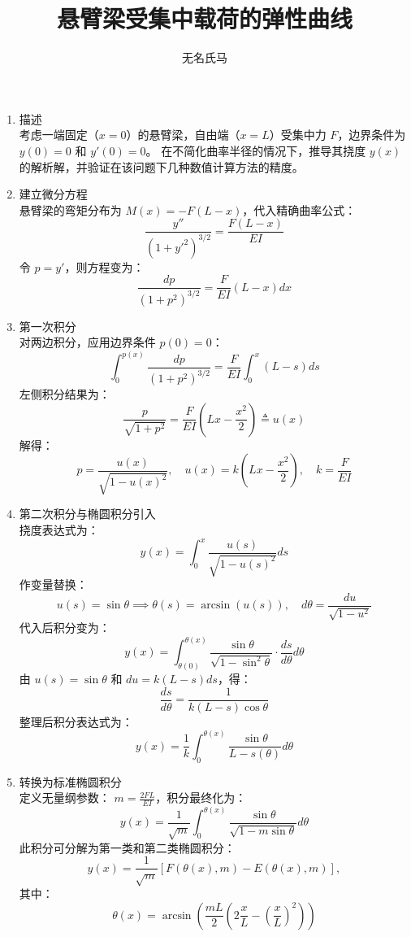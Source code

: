 \documentclass[12pt, a4paper,oneside, UTF8]{ctexart} %
\begin{document}
\title{悬臂梁受集中载荷的弹性曲线}
\author{无名氏马}
\maketitle
\begin{enumerate}
    \item  描述\\
    考虑一端固定（\(x=0\)）的悬臂梁，自由端（\(x=L\)）受集中力 \(F\)，边界条件为 \(y(0)=0\) 和 \(y'(0)=0\)。
    在不简化曲率半径的情况下，推导其挠度 \(y(x)\) 的解析解，并验证在该问题下几种数值计算方法的精度。
    
    \item  建立微分方程\\
    悬臂梁的弯矩分布为 \(M(x) = -F(L - x)\)，代入精确曲率公式：
    \[
    \frac{y''}{(1 + y'^2)^{3/2}} = \frac{F(L - x)}{EI} 
    \]
    令 \(p = y'\)，则方程变为：
    \[
    \frac{dp}{(1 + p^2)^{3/2}} = \frac{F}{EI}(L - x) dx 
    \]
    
    \item  第一次积分\\
    对两边积分，应用边界条件 \(p(0) = 0\)：
    \[
    \int_0^{p(x)} \frac{dp}{(1 + p^2)^{3/2}} = \frac{F}{EI} \int_0^x (L - s) ds 
    \]
    左侧积分结果为：
    \[
    \frac{p}{\sqrt{1 + p^2}} = \frac{F}{EI} \left(Lx - \frac{x^2}{2}\right) \triangleq u(x) 
    \]
解得：
\[
p = \frac{u(x)}{\sqrt{1 - u(x)^2}}, \quad u(x) = k\left(Lx - \frac{x^2}{2}\right), \quad k = \frac{F}{EI} 
\]

\item 第二次积分与椭圆积分引入\\
挠度表达式为：
\[
y(x) = \int_0^x \frac{u(s)}{\sqrt{1 - u(s)^2}} ds 
\]
作变量替换：
\[
u(s) = \sin\theta \implies \theta(s) = \arcsin(u(s)), \quad d\theta = \frac{du}{\sqrt{1 - u^2}} 
\]
代入后积分变为：
\[
y(x) = \int_{\theta(0)}^{\theta(x)} \frac{\sin\theta}{\sqrt{1 - \sin^2\theta}} \cdot \frac{ds}{d\theta} d\theta 
\]
由 \(u(s) = \sin\theta\) 和 \(du = k(L - s)ds\)，得：
\[
\frac{ds}{d\theta} = \frac{1}{k(L - s)\cos\theta} 
\]
整理后积分表达式为：
\[
y(x) = \frac{1}{k} \int_0^{\theta(x)} \frac{\sin\theta}{L - s(\theta)} d\theta 
\]

\item 转换为标准椭圆积分\\
定义无量纲参数：
\(m =\frac{2FL}{EI} \)，积分最终化为：
\[
y(x) = \frac{1}{\sqrt{m}} \int_0^{\theta(x)} \frac{\sin\theta}{\sqrt{1 - m\sin\theta}} d\theta 
\]
此积分可分解为第一类和第二类椭圆积分：
\[
y(x) = \frac{1}{\sqrt{m}} \left[ F(\theta(x), m) - E(\theta(x), m) \right],
\]
其中：
\[
\theta(x) = \arcsin\left(\frac{mL}{2} \left(2\frac{x}{L} - \left(\frac{x}{L}\right)^2\right)\right) 
\]
    

\end{enumerate}
\end{document}
